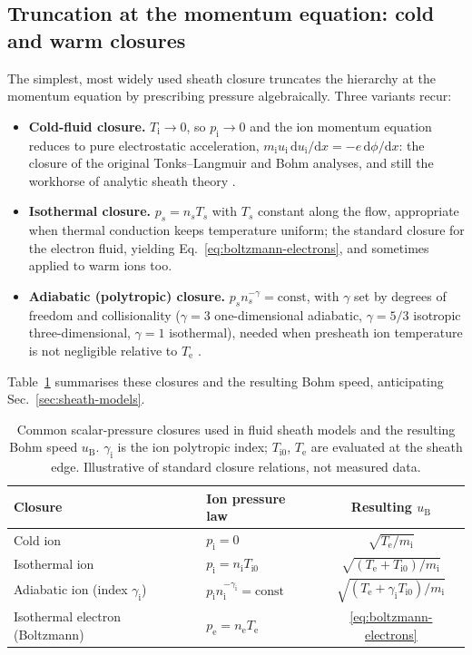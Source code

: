 \subsection{Truncation at the momentum equation: cold and warm closures}

The simplest, most widely used sheath closure truncates the hierarchy at the momentum equation by prescribing pressure algebraically. Three variants recur:

\begin{itemize}
\item \textbf{Cold-fluid closure.} $T_{\mathrm{i}}\to0$, so $p_{\mathrm{i}}\to0$ and the ion momentum equation reduces to pure electrostatic acceleration, $m_{\mathrm{i}} u_{\mathrm{i}}\,\mathrm{d}u_{\mathrm{i}}/\mathrm{d}x = -e\,\mathrm{d}\phi/\mathrm{d}x$: the closure of the original Tonks--Langmuir and Bohm analyses, and still the workhorse of analytic sheath theory \cite{ref0013}.
\item \textbf{Isothermal closure.} $p_s = n_sT_s$ with $T_s$ constant along the flow, appropriate when thermal conduction keeps temperature uniform; the standard closure for the electron fluid, yielding Eq.~\eqref{eq:boltzmann-electrons}, and sometimes applied to warm ions too.
\item \textbf{Adiabatic (polytropic) closure.} $p_s n_s^{-\gamma} = \mathrm{const}$, with $\gamma$ set by degrees of freedom and collisionality ($\gamma=3$ one-dimensional adiabatic, $\gamma=5/3$ isotropic three-dimensional, $\gamma=1$ isothermal), needed when presheath ion temperature is not negligible relative to $T_{\mathrm{e}}$ \cite{ref0090}.
\end{itemize}

Table~\ref{tab:closures} summarises these closures and the resulting Bohm speed, anticipating Sec.~\ref{sec:sheath-models}.

\begin{table}[htbp]
\centering
\caption{Common scalar-pressure closures used in fluid sheath models and the resulting Bohm speed $u_{\mathrm{B}}$. $\gamma_{\mathrm{i}}$ is the ion polytropic index; $T_{\mathrm{i}0}$, $T_{\mathrm{e}}$ are evaluated at the sheath edge. Illustrative of standard closure relations, not measured data.}
\label{tab:closures}
\begin{tabular}{@{}llc@{}}
\toprule
Closure & Ion pressure law & Resulting $u_{\mathrm{B}}$ \\
\midrule
Cold ion & $p_{\mathrm{i}}=0$ & $\sqrt{T_{\mathrm{e}}/m_{\mathrm{i}}}$ \\
Isothermal ion & $p_{\mathrm{i}}=n_{\mathrm{i}}T_{\mathrm{i}0}$ & $\sqrt{(T_{\mathrm{e}}+T_{\mathrm{i}0})/m_{\mathrm{i}}}$ \\
Adiabatic ion (index $\gamma_{\mathrm{i}}$) & $p_{\mathrm{i}}n_{\mathrm{i}}^{-\gamma_{\mathrm{i}}}=\mathrm{const}$ & $\sqrt{(T_{\mathrm{e}}+\gamma_{\mathrm{i}}T_{\mathrm{i}0})/m_{\mathrm{i}}}$ \\
Isothermal electron (Boltzmann) & $p_{\mathrm{e}}=n_{\mathrm{e}}T_{\mathrm{e}}$ & \eqref{eq:boltzmann-electrons} \\
\bottomrule
\end{tabular}
\end{table}

